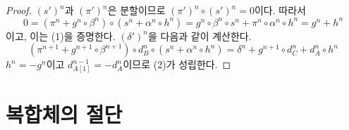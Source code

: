 \begin{proof}
$(s')^n$과 $(\pi')^n$은 분할이므로
$(\pi')^n \circ (s')^n = 0$이다. 따라서
$$
0 = ( \pi^n + g^n \circ \beta^n ) \circ ( s^n + \alpha^n \circ h^n ) =
g^n \circ \beta^n \circ s^n + \pi^n \circ \alpha^n \circ h^n =
g^n + h^n
$$
이고, 이는 (1)을 증명한다. $(\delta')^n$을 다음과 같이 계산한다.
$$
( \pi^{n + 1} + g^{n + 1} \circ \beta^{n + 1} )
\circ d_B^n \circ
( s^n + \alpha^n \circ h^n )
= \delta^n + g^{n + 1} \circ d_C^n + d_A^n \circ h^n
$$
$h^n = -g^n$이고 $d_{A[1]}^{n - 1} = -d_A^n$이므로 (2)가
성립한다.
\end{proof}




\section{복합체의 절단}
\label{section-truncations}

